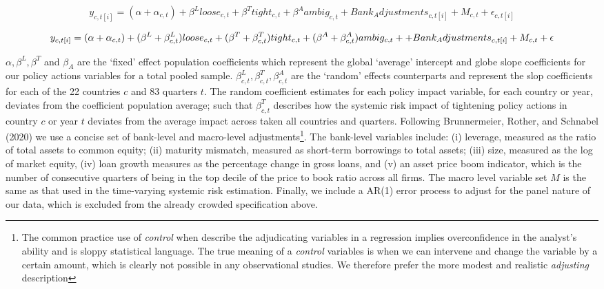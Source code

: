 \documentclass[
  10pt,
]{article}
\begin{document}
\begin{equation}\label{eq:eq8}
 y_{c,t[i]} = (\alpha + \alpha_{c,t}) + \beta^L loose_{c,t}+\beta^T tight_{c,t}+\beta^A ambig_{c,t}+Bank_Adjustments_{c,t[i]}+M_{c,t}+\epsilon_{c,t[i]}
\end{equation}

\begin{equation}\label{eq:eq9}
y_{c,t[i]} = (\alpha + \alpha_{c,t}) + (\beta^L+\beta^L_{c,t})loose_{c,t}+(\beta^T+\beta^T_{c,t})tight_{c,t} \\
  +(\beta^A+\beta^A_{c,t})ambig_{c,t}++Bank_Adjustments_{c,t[i]}+M_{c,t}+\epsilon
\end{equation}

\(\alpha, \beta^L, \beta^T\) and \(\beta_A\) are the `fixed' effect
population coefficients which represent the global `average' intercept
and globe slope coefficients for our policy actions variables for a
total pooled sample. \(\beta^L_{c,t},\beta^T_{c,t},\beta^A_{c,t}\) are
the `random' effects counterparts and represent the slop coefficients
for each of the 22 countries \(c\) and 83 quarters \(t\). The random
coefficient estimates for each policy impact variable, for each country
or year, deviates from the coefficient population average; such that
\(\beta^T_{c,t}\) describes how the systemic risk impact of tightening
policy actions in country \(c\) or year \(t\) deviates from the average
impact across taken all countries and quarters. Following Brunnermeier,
Rother, and Schnabel (2020) we use a concise set of bank-level and
macro-level adjustments\footnote{The common practice use of
  \emph{control} when describe the adjudicating variables in a
  regression implies overconfidence in the analyst's ability and is
  sloppy statistical language. The true meaning of a \emph{control}
  variables is when we can intervene and change the variable by a
  certain amount, which is clearly not possible in any observational
  studies. We therefore prefer the more modest and realistic
  \emph{adjusting} description}. The bank-level variables include: (i)
leverage, measured as the ratio of total assets to common equity; (ii)
maturity mismatch, measured as short-term borrowings to total assets;
(iii) size, measured as the log of market equity, (iv) loan growth
measures as the percentage change in gross loans, and (v) an asset price
boom indicator, which is the number of consecutive quarters of being in
the top decile of the price to book ratio across all firms. The macro
level variable set \(M\) is the same as that used in the time-varying
systemic risk estimation. Finally, we include a AR(1) error process to
adjust for the panel nature of our data, which is excluded from the
already crowded specification above.
\end{document}
